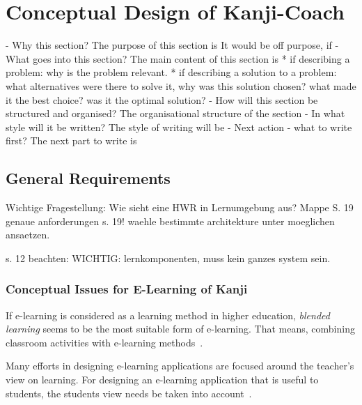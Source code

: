 
\chapter{Conceptual Design of Kanji-Coach}
\label{chap:conceptualdesignofkanjicoach}

- Why this section? 
  The purpose of this section is 
  It would be off purpose, if 
- What goes into this section?
  The main content of this section is 
  * if describing a problem: why is the problem relevant.
  * if describing a solution to a problem: what alternatives were
    there to solve it, why was this solution chosen? 
    what made it the best choice? was it the optimal solution?
- How will this section be structured and organised?
  The organisational structure of the section 
- In what style will it be written?
  The style of writing will be 
- Next action - what to write first?
  The next part to write is


\section{General Requirements}
\label{sec:concept:generalrequirements}

Wichtige Fragestellung: Wie sieht eine HWR in Lernumgebung aus?
Mappe S. 19
genaue anforderungen s. 19!
waehle bestimmte architekture unter moeglichen ansaetzen.

s. 12 beachten: WICHTIG: lernkomponenten, muss kein ganzes system sein.

\subsection{Conceptual Issues for E-Learning of Kanji}
\label{sec:elearn:conceptualissuesforelearningofkanji}






If e-learning is considered as a learning method in higher education, 
\emph{blended learning} seems to be the most suitable form of e-learning.
That means, combining classroom activities with e-learning 
methods~.


Many efforts in designing e-learning applications are focused around the
teacher's view on learning. For designing an e-learning application that
is useful to students, the students view needs be taken into 
account~.

